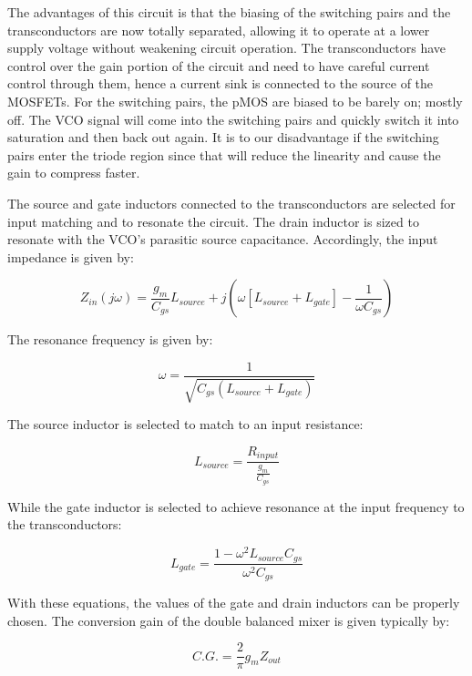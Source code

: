 The advantages of this circuit is that the biasing of the switching pairs and the transconductors are now totally separated, allowing it to operate at a lower supply voltage without weakening circuit operation. The transconductors have control over the gain portion of the circuit and need to have careful current control through them, hence a current sink is connected to the source of the MOSFETs. For the switching pairs, the pMOS are biased to be barely on; mostly off.  The VCO signal will come into the switching pairs and quickly switch it into saturation and then back out again. It is to our disadvantage if the switching pairs enter the triode region since that will reduce the linearity and cause the gain to compress faster. 

The source and gate inductors connected to the transconductors are selected for input matching and to resonate the circuit. The drain inductor is sized to resonate with the VCO's parasitic source capacitance. Accordingly, the input impedance is given by:

\begin{equation} 
  	Z_{in}(j\omega) = \frac{g_{m}}{C_{gs}}L_{source}+j(\omega[L_{source}+L_{gate}]-\frac{1}{\omega C_{gs}})
	\label{eq:mixerZin}
\end{equation}

The resonance frequency is given by:

\begin{equation}
\omega = \frac{1}{\sqrt{C_{gs}(L_{source}+L_{gate})}}
\end{equation}

The source inductor is selected to match to an input resistance:

\begin{equation}
L_{source} = \frac{R_{input}}{\frac{g_{m}}{C_{gs}}}
\end{equation}

While the gate inductor is selected to achieve resonance at the input frequency to the transconductors:

\begin{equation}
L_{gate}=\frac{1-\omega^{2}L_{source}C_{gs}}{\omega^{2}C_{gs}}
\end{equation}

With these equations, the values of the gate and drain inductors can be properly chosen.
The conversion gain of the double balanced mixer is given typically by:

\begin{equation}
C.G. = \frac{2}{\pi}g_{m}Z_{out}
\end{equation}


